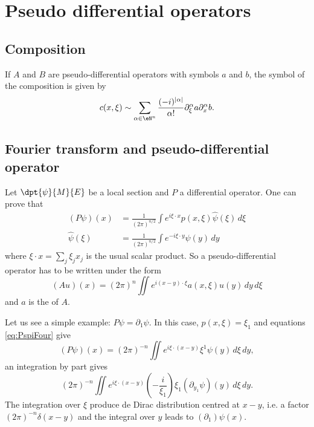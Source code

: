 \section{Pseudo differential operators}

\subsection{Composition}

If $A$ and $B$ are pseudo-differential operators with symbols $a$ and $b$, the symbol of the composition is given by
\begin{equation}		\label{EqCompPSDSymb}
c(x,\xi)\sim \sum_{\alpha\in\eN^n} \frac{ (-i)^{| \alpha |} }{ \alpha! }\partial_{\xi}^{\alpha}a\partial_x^{\alpha}b.
\end{equation}


\subsection{Fourier transform and pseudo-differential operator} 

Let $\dpt{ \psi }{ M }{ E }$ be a local section and $P$ a differential operator. One can prove that
\begin{subequations} \label{eq:PspiFour}
\begin{align}
  (P\psi)(x)&=\frac{1}{ (2\pi)^{n/2} } \int e^{i\xi\cdot x}p(x,\xi)\hat\psi(\xi)\,d\xi\\
  \hat\psi(\xi)&= \frac{1}{ (2\pi)^{n/2} }\int e^{-i\xi\cdot y}\psi(y)\,dy 
\end{align}
\end{subequations}
where $\xi\cdot x=\sum_j\xi_jx_j$ is the usual scalar product. So a pseudo-differential operator has to be written under the form
\begin{equation}
  (Au)(x)=(2\pi)^n\iint e^{i(x-y)\cdot \xi}a(x,\xi)u(y)\,dy\,d\xi
\end{equation}
and $a$ is the  of $A$.


Let us see a simple example: $P\psi=\partial_1\psi$. In this case, $p(x,\xi)=\xi_1$ and equations \eqref{eq:PspiFour} give
\[ 
  (P\psi)(x)=(2\pi)^{-n}\iint e^{i\xi\cdot(x-y)}\xi^1\psi(y)\,d\xi\,dy,
\]
 an integration by part gives
\[ 
  (2\pi)^{-n}\iint e^{i\xi\cdot(x-y)}(-\frac{ i }{ \xi_1 })\xi_1(\partial_{y_1}\psi)(y)\,d\xi\,dy.
\]
The integration over $\xi$ produce de Dirac distribution centred at $x-y$, i.e. a factor $(2\pi)^{-n}\delta(x-y)$ and the integral over $y$ leads to $(\partial_1)\psi(x)$.

